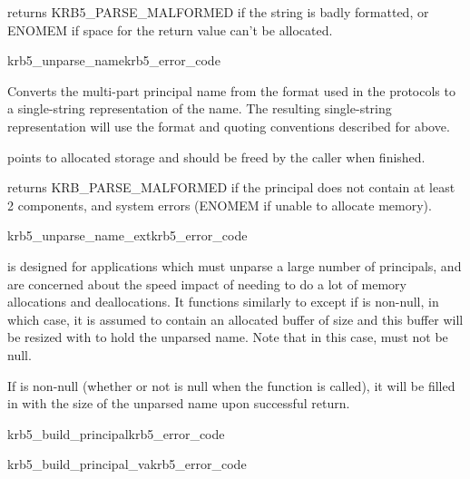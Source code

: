  returns KRB5_PARSE_MALFORMED if the string is
 badly formatted, or ENOMEM if space for the return value can't be
allocated.

\begin{funcdecl}{krb5_unparse_name}{krb5_error_code}{\funcin}
\funcout
{}
\end{funcdecl}

Converts the multi-part principal name  from the
format used in the protocols to a single-string representation of the
name.  The resulting single-string representation will use the format
and quoting conventions described for 
above.

 points to allocated storage and should be freed by the caller
when finished.

 returns KRB_PARSE_MALFORMED if the principal
does not contain at least 2 components, and system errors (ENOMEM if
unable to allocate memory).

\begin{funcdecl}{krb5_unparse_name_ext}{krb5_error_code}{\funcin}
\funcinout
{}
\end{funcdecl}

 is designed for applications which
must unparse a large number of principals, and are concerned about the
speed impact of needing to do a lot of memory allocations and
deallocations.  It functions similarly to 
except if  is non-null, in which case, it is assumed
to contain an allocated buffer of size  and this
buffer will be resized with  to hold the unparsed
name.  Note that in this case,
 must not be null.  

If  is non-null (whether or not  is
null when the function is called), it will be filled in with the size
of the unparsed name upon successful return.

\begin{funcdecl}{krb5_build_principal}{krb5_error_code}{\funcout}
\funcin
{}
\end{funcdecl}
\begin{funcdecl}{krb5_build_principal_va}{krb5_error_code}{\funcout}
\funcin
{}
\end{funcdecl}

